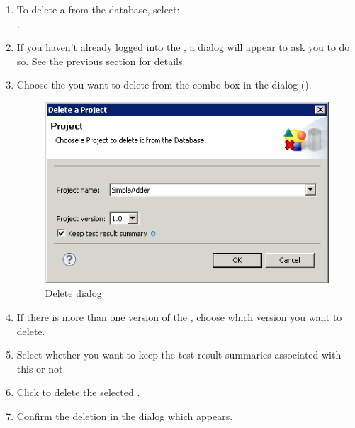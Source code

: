 \begin{enumerate}
\item To delete a \gdproject{} from the database, select:\\
.
\item If you haven't already logged into the \gddb{}, a dialog will appear to ask you to do so.  See the previous section  for details. 
\item Choose the \gdproject{} you want to delete from the combo box in the dialog ().
 \begin{figure}[h]
\begin{center}
\includegraphics{Tasks/Projects/PS/deleteproject}
\caption{Delete \gdproject{} dialog}
\label{deleteproject}
\end{center}
\end{figure}

\item If there is more than one version of the \gdproject{}, choose which version you want to delete. 
\item Select whether you want to keep the test result summaries associated with this \gdproject{} or not. 
\item Click  to delete the selected \gdproject{}. 
\item Confirm the deletion in the dialog which appears.
\end{enumerate}
